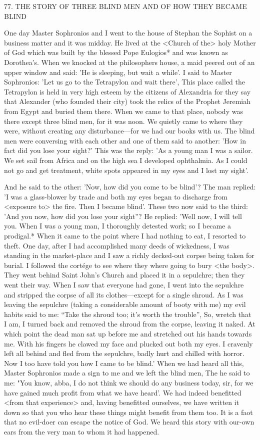77.
THE STORY OF THREE BLIND MEN
AND OF HOW THEY BECAME BLIND

One day Master Sophronios and I went to the house of Stephan the
Sophist on a business matter and it was midday.
He lived at the
<Church of the> holy Mother of God which was built by the
blessed Pope Eulogios* and was known as Dorothea's.
When we
knocked at the philosopher\textquotesingle s house, a maid peered out of an upper
window and said: 'He is sleeping, but wait a while'.
I said to Master
Sophronios: 'Let us go to the Tetrapylon and wait there', This place
called the Tetrapylon is held in very high esteem by the citizens of
Alexandria for they say that Alexander (who founded their city)
took the relics of the Prophet Jeremiah from Egypt and buried them
there.
When we came to that place, nobody was there except three
blind men, for it was noon.
We quietly came to where they were,
without creating any disturbance—for we had our books with us.
The blind men were conversing with each other and one of them
said to another: 'How in fact did you lose your sight?' This was the
reply: 'As a young man I was a sailor.
We set sail from Africa and
on the high sea I developed ophthalmia.
As I could not go and get
treatment, white spots appeared in my eyes and I lost my sight'.

And he said to the other: 'Now, how did you come to be blind'?
The man replied: 'I was a glass-blower by trade and both my eyes
began to discharge from <exposure to> the fire.
Then I became
blind'.
These two now said to the third: 'And you now, how did you
lose your sight”? He replied: 'Well now, I will tell you.
When I was
a young man, I thoroughly detested work; so I became a prodigal.*
When it came to the point where I had nothing to eat, I resorted to
theft.
One day, after I had accomplished many deeds of wickedness,
I was standing in the market-place and I saw a richly decked-out
corpse being taken for burial.
I followed the cortége to see where
they where going to bury <the body>.
They went behind Saint
John's Church and placed it in a sepulchre; then they went their
way.
When I saw that everyone had gone, I went into the sepulchre
and stripped the corpse of all its clothes—except for a single shroud.
As I was leaving the sepulchre (taking a considerable amount of
booty with me) my evil habits said to me: “Take the shroud too; it's
worth the trouble”, So, wretch that I am, I turned back and
removed the shroud from the corpse, leaving it naked.
At which
point the dead man sat up before me and stretched out his hands
towards me.
With his fingers he clawed my face and plucked out
both my eyes.
I cravenly left all behind and fled from the sepulchre,
badly hurt and chilled with horror.
Now I too have told you how
I came to be blind.' When we had heard all this, Master Sophronios
made a sign to me and we left the blind men, The he said to me:
"You know, abba, I do not think we should do any business today,
sir, for we have gained much profit from what we have heard'.
We
had indeed benefitted <from that experience> and, having benefitted
ourselves, we have written it down so that you who hear these
things might benefit from them too.
It is a faot that no evil-doer can
escape the notice of God.
We heard this story with our-own ears
from the very man to whom it had happened.

